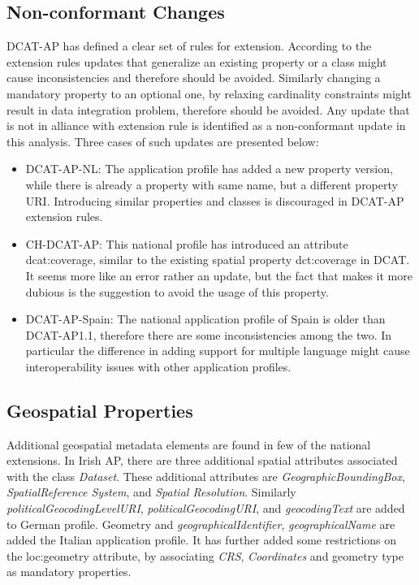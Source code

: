 \documentclass[<options>]{elsarticle}
\begin{document}
\subsection{Non-conformant Changes}
DCAT-AP has defined a clear set of rules for extension. According to the extension rules updates that generalize an existing property or a class might cause inconsistencies and therefore should be avoided. Similarly changing a mandatory property to an optional one, by relaxing cardinality constraints might result in data integration problem, therefore should be avoided. Any update that is not in alliance with extension rule is identified as a non-conformant update in this analysis. Three cases of such updates are presented below:

\begin{itemize}
\item DCAT-AP-NL: The application profile has added a new property version, while there is already a property with same name, but a different property URI. Introducing similar properties and classes is discouraged in DCAT-AP extension rules.
\item CH-DCAT-AP: This national profile has introduced an attribute dcat:coverage, similar to the existing spatial property dct:coverage in DCAT. It seems more like an error rather an update, but the fact that makes it more dubious is the suggestion to avoid the usage of this property.   
\item DCAT-AP-Spain: The national application profile of Spain is older than DCAT-AP1.1, therefore there are some inconsistencies among the two. In particular the difference in adding support for multiple language might cause interoperability issues with other application profiles. 
\end{itemize}

\subsection{Geospatial Properties}
Additional geospatial metadata elements are found in few of the national extensions. In Irish AP, there are three additional spatial attributes associated with the class \textit{Dataset}. These additional attributes are \textit{GeographicBoundingBox}, \textit{SpatialReference System}, and \textit{Spatial Resolution}. Similarly \textit{politicalGeocodingLevelURI}, \textit{politicalGeocodingURI}, and \textit{geocodingText }are added to German profile. Geometry and \textit{geographicalIdentifier}, \textit{geographicalName }are added the Italian application profile. It has further added some restrictions on the loc:geometry attribute, by associating \textit{CRS}, \textit{Coordinates} and geometry type  as mandatory properties.
\end{document}
